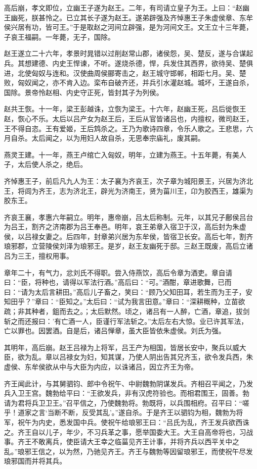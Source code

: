\documentclass[]{article}
\begin{document}
高后崩，孝文即位，立幽王子遂为赵王。二年，有司请立皇子为王。上曰：``赵幽王幽死，朕甚怜之。已立其长子遂为赵王。遂弟辟强及齐悼惠王子朱虚侯章、东牟侯兴居有功，皆可王。''于是取赵之河间立辟强，是为河间文王。文王立十三年薨，子哀王福嗣。一年薨，无子，国除。

赵王遂立二十六年，孝景时晁错以过削赵常山郡，诸侯怨，吴、楚反，遂与合谋起兵。其想建德、内史王悍谏，不听。遂烧杀德，悍，兵发住其西界，欲待吴、楚俱进，北使匈奴与连和。汉使曲周侯郦寄击之，赵王城守邯郸，相距七月。吴、楚败，匈奴闻之，亦不肯入边。栾布自破齐还，并兵引水灌赵城。城坏，王遂自杀，国除。景帝怜赵相、内史守正死，皆封其子为列侯。

赵共王恢。十一年，梁王彭越诛，立恢为梁王。十六年，赵幽王死，吕后徙恢王赵，恢心不乐。太后以吕产女为赵王后，王后从官皆诸吕也，内擅权，微司赵王，王不得自恣。王有爱姬，王后鸩杀之。王乃为歌诗四章，令乐人歌之。王悲思，六月自杀。太后闻之，以为用妇人故自杀，无思奉宗庙礼，废其嗣。

燕灵王建。十一年，燕王卢绾亡入匈奴，明年，立建为燕王。十五年薨，有美人子，太后使人杀之，绝后。

齐悼惠王子，前后凡九人为王：太子襄为齐哀王，次子章为城阳景王，兴居为济北王，将闾为齐王，志为济北王，辟光为济南王，贤为菑川王，卬为胶西王，雄渠为胶东王。

齐哀王襄，孝惠六年嗣立。明年，惠帝崩，吕太后称制。元年，以其兄子鄜侯吕台为吕王，割齐之济南郡为吕王奉邑。明年，哀王弟章入宿卫于汉，高后封为朱虚侯，以吕禄女妻之。后四年，封章弟兴居为东牟侯，皆宿卫长安。高后七年，割齐琅邪郡，立营陵侯刘泽为琅邪王。是岁，赵王友幽死于邸。三赵王既废，高后立诸吕为三王，擅权用事。

章年二十，有气力，忿刘氏不得职。尝入侍燕饮，高后令章为酒吏。章自请曰：``臣，将种也，请得以军法行酒。''高后曰：``可。''酒酣，章进歌舞，已而曰：``请为太后言耕田。''高后儿子畜之，笑曰：``顾乃父知田耳，若生而为王子，安知田乎？''章曰：``臣知之。''太后曰：``试为我言田意。''章曰：``深耕穊种，立苗欲疏；非其种者，鉏而去之。；太后默然。顷之，诸吕有一人醉，亡酒，章追，拔剑斩之而还报曰：'有亡酒一人，臣谨行军法斩之。''太后左右大惊。业已许其军法，亡以罪也。因罢酒。自是后，诸吕惮章，虽大臣皆依朱虚侯。刘氏为强。

其明年，高后崩。赵王吕禄为上将军，吕王产为相国，皆居长安中，聚兵以威大臣，欲为乱。章以吕禄女为妇，知其谋，乃使人阴出告其兄齐玉，欲令发兵西，朱虚侯、东牟侯欲从中与大臣为内应，以诛诸吕，因立齐王为帝。

齐王闻此计，与其舅驷钧、郎中令祝午、中尉魏勃阴谋发兵。齐相召平闻之，乃发兵入卫王宫。魏勃给平曰：``王欲发兵，非有汉虎符验也。而相君围王，固善。勃请为君将兵卫卫王。''召平信之，乃使魏勃将。勃既将，以兵围相府。召平曰：``嗟乎！道家之言`当断不断，反受其乱'。''遂自杀。于是齐王以驷钧为相，魏勃为将军，祝午为内史，悉发国中兵。使祝午给琅邪王曰：``吕氏为乱，齐王发兵欲西诛之。齐王自以儿子，年少，不习兵革之事，愿举国委大王。大王自高帝将也，习战事。齐王不敢离兵，使臣请大王幸之临菑见齐王计事，并将齐兵以西平关中之乱。''琅邪王信之，以为然，乃驰见齐王。齐王与魏勃等因留琅邪王，而使祝午尽发琅邪国而并将其兵。
\end{document}
